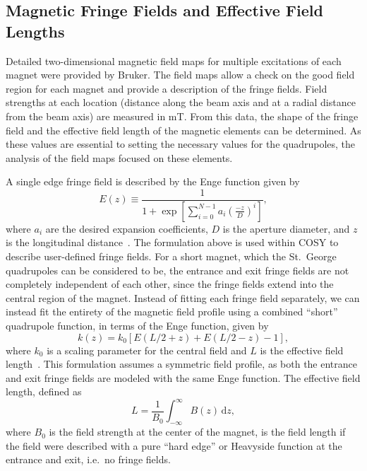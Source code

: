 \subsection{Magnetic Fringe Fields and Effective Field Lengths}

Detailed two-dimensional magnetic field maps for multiple excitations of
each magnet were provided by Bruker. The field maps allow a check on the
good field region for each magnet and provide a description of the
fringe fields. Field strengths at each location (distance along the beam
axis and at a radial distance from the beam axis) are measured in mT.
From this data, the shape of the fringe field and the effective field
length of the magnetic elements can be determined. As these values are
essential to setting the necessary values for the quadrupoles, the
analysis of the field maps focused on these elements.

A single edge fringe field is described by the Enge function given by
\begin{equation}
    \label{eq:enge}
    E(z) \equiv \frac{1}{1 +
        \exp\left[\sum_{i=0}^{N-1}{a_i}(\frac{-z}{D})^{i}\right]},
\end{equation}
where $a_i$ are the desired expansion coefficients, $D$ is the aperture
diameter, and $z$ is the longitudinal distance~\cite{Baartman2007}. The
formulation above is used within COSY to describe user-defined fringe
fields. For a short magnet, which the St.\ George quadrupoles can be
considered to be, the entrance and exit fringe fields are not completely
independent of each other, since the fringe fields extend into the
central region of the magnet. Instead of fitting each fringe field
separately, we can instead fit the entirety of the magnetic field
profile using a combined ``short'' quadrupole function, in terms of the
Enge function, given by
\begin{equation}
    \label{eq:shortquad}
    k(z) = k_0\left[E(L/2 + z) + E(L/2 - z) - 1\right],
\end{equation}
where $k_0$ is a scaling parameter for the central field and $L$ is the
effective field length~\cite{Baartman2007}. This formulation assumes a
symmetric field profile, as both the entrance and exit fringe fields are
modeled with the same Enge function. The effective field length, defined
as
\begin{equation}
    \label{eq:efl}
    L = \frac{1}{B_0}\int_{-\infty}^{\infty} B(z)\, \textrm{d}z,
\end{equation}
where $B_0$ is the field strength at the center of the magnet, is the
field length if the field were described with a pure ``hard edge'' or
Heavyside function at the entrance and exit, i.e.\ no fringe fields.

